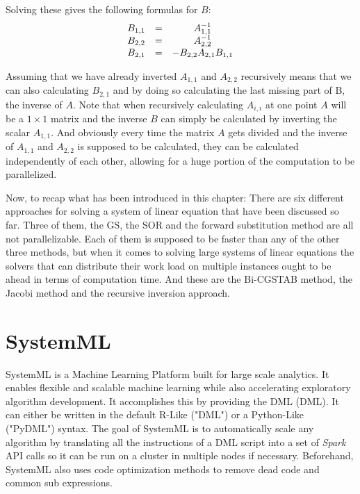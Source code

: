 Solving these gives the following formulas for $B$:
\begin{equation}\label{eq:derive_recursive_inversion_3}
    \begin{array}[c]{ccc}
        B_{1,1} &=& A_{1,1}^{-1}\\
        B_{2,2} &=& A_{2,2}^{-1} \\
        B_{2,1} &=& - B_{2,2} A_{2,1} B_{1,1}
    \end{array}
\end{equation}

Assuming that we have already inverted $A_{1,1}$ and $A_{2,2}$ recursively means that we can also calculating $B_{2,1}$ and by doing so calculating the last missing part of B, the inverse of $A$. Note that when recursively calculating $A_{i,i}$ at one point $A$ will be a $1 \times 1$ matrix and the inverse $B$ can simply be calculated by inverting the scalar $A_{1,1}$. And obviously every time the matrix $A$ gets divided and the inverse of $A_{1,1}$ and $A_{2,2}$ is supposed to be calculated, they can be calculated independently of each other, allowing for a huge portion of the computation to be parallelized.

Now, to recap what has been introduced in this chapter: There are six different approaches for solving a system of linear equation that have been discussed so far. Three of them, the \acl{GS}, the \acl{SOR} and the forward substitution method are all not parallelizable. Each of them is supposed to be faster than any of the other three methods, but when it comes to solving large systems of linear equations the solvers that can distribute their work load on multiple instances ought to be ahead in terms of computation time. And these are the \acl{Bi-CGSTAB} method, the Jacobi method and the recursive inversion approach.


\section{SystemML}\label{systemml}
SystemML is a Machine Learning Platform built for large scale analytics. It enables flexible and scalable machine learning while also accelerating exploratory algorithm development. 
It accomplishes this by providing the \acl{DML} (\acs{DML}). It can either be written in the default R-Like ("DML") or a Python-Like ("PyDML") syntax.\textsuperscript{\cite{SystemMLDocumentation}}
The goal of SystemML is to automatically scale any algorithm by translating all the instructions of a \acs{DML} script into a set of \textit{Spark} \acs{API} calls so it can be run on a cluster in multiple nodes if necessary. Beforehand, SystemML also uses code optimization methods to remove dead code and common sub expressions. \textsuperscript{\cite[p.~52]{Boehm2014SystemMLsPrograms}}


